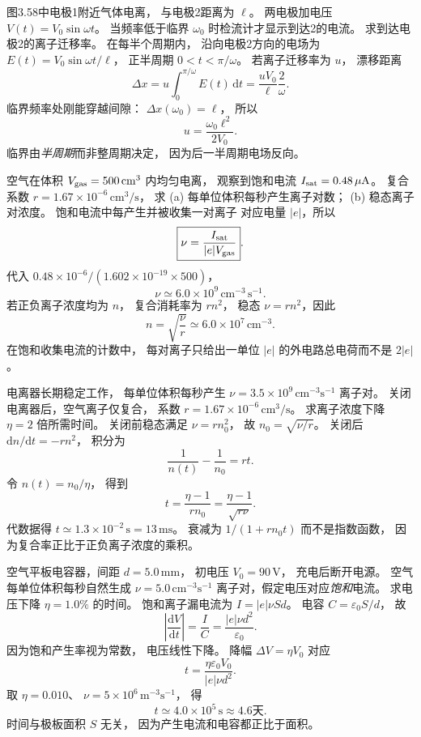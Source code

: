 图3.58中电极1附近气体电离，
与电极2距离为 $\ell$。
两电极加电压
$V(t)=V_0\sin\omega t$。
当频率低于临界
$\omega_0$ 时检流计才显示到达2的电流。
求到达电极2的离子迁移率。
\exsolution
在每半个周期内，
沿向电极2方向的电场为
$E(t)=V_0\sin\omega t/\ell$，
正半周期 $0<t<\pi/\omega$。
若离子迁移率为 $u$，
漂移距离
\[
\Delta x=u\int_0^{\pi/\omega}E(t)\,\mathrm dt
=\frac{uV_0}{\ell}
\frac2\omega.
\]
临界频率处刚能穿越间隙：
$\Delta x(\omega_0)=\ell$，
所以
\[
\boxed{u=\frac{\omega_0\ell^2}{2V_0}}.
\]
\excheck 临界由\emph{半周期}而非整周期决定，
因为后一半周期电场反向。

空气在体积
$V_{\rm gas}=500\,\mathrm{cm^3}$
内均匀电离，
观察到饱和电流
$I_{\rm sat}=0.48\,\mathrm{\mu A}$。
复合系数
$r=1.67\times10^{-6}\,\mathrm{cm^3/s}$，
求 (a) 每单位体积每秒产生离子对数；
(b) 稳态离子对浓度。
\exsolution
饱和电流中每产生并被收集一对离子
对应电量 $|e|$，所以
\[
\boxed{\nu=\frac{I_{\rm sat}}
{|e|V_{\rm gas}}}.
\]
代入
$0.48\times10^{-6}/
(1.602\times10^{-19}\times500)$，
\[
\boxed{\nu\simeq6.0\times10^9\,
\mathrm{cm^{-3}\,s^{-1}}}.
\]
若正负离子浓度均为 $n$，
复合消耗率为 $rn^2$，
稳态 $\nu=rn^2$，因此
\[
\boxed{n=\sqrt{\frac\nu r}
\simeq6.0\times10^7\,\mathrm{cm^{-3}}}.
\]
\excheck 在饱和收集电流的计数中，
每对离子只给出一单位 $|e|$
的外电路总电荷而不是 $2|e|$。

电离器长期稳定工作，
每单位体积每秒产生
$\nu=3.5\times10^9\,
\mathrm{cm^{-3}s^{-1}}$ 离子对。
关闭电离器后，空气离子仅复合，
系数 $r=1.67\times10^{-6}\,\mathrm{cm^3/s}$。
求离子浓度下降 $\eta=2$ 倍所需时间。
\exsolution
关闭前稳态满足 $\nu=rn_0^2$，
故 $n_0=\sqrt{\nu/r}$。
关闭后
$\mathrm dn/\mathrm dt=-rn^2$，
积分为
\[
\frac1{n(t)}-\frac1{n_0}=rt.
\]
令 $n(t)=n_0/\eta$，
得到
\[
\boxed{t=\frac{\eta-1}{rn_0}
=\frac{\eta-1}{\sqrt{r\nu}}}.
\]
代数据得
$\boxed{t\simeq1.3\times10^{-2}\,\mathrm s
=13\,\mathrm{ms}}$。
\excheck 衰减为 $1/(1+rn_0t)$
而不是指数函数，
因为复合率正比于正负离子浓度的乘积。

空气平板电容器，间距
$d=5.0\,\mathrm{mm}$，
初电压 $V_0=90\,\mathrm V$，
充电后断开电源。
空气每单位体积每秒自然生成
$\nu=5.0\,\mathrm{cm^{-3}s^{-1}}$
离子对，假定电压对应\emph{饱和}电流。
求电压下降 $\eta=1.0\%$ 的时间。
\exsolution
饱和离子漏电流为
$I=|e|\nu Sd$。
电容 $C=\varepsilon_0S/d$，
故
\[
\left|\frac{\mathrm dV}{\mathrm dt}\right|
=\frac IC=\frac{|e|\nu d^2}{\varepsilon_0}.
\]
因为饱和产生率视为常数，
电压线性下降。
降幅 $\Delta V=\eta V_0$ 对应
\[
\boxed{t=\frac{\eta\varepsilon_0V_0}
{|e|\nu d^2}}.
\]
取 $\eta=0.010$、
$\nu=5\times10^6\,\mathrm{m^{-3}s^{-1}}$，
得
\[
\boxed{t\simeq4.0\times10^5\,\mathrm s
\approx4.6\text{天}}.
\]
\excheck 时间与极板面积 $S$ 无关，
因为产生电流和电容都正比于面积。

